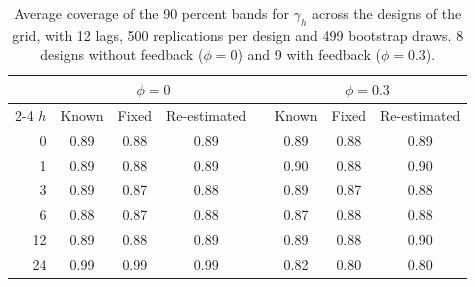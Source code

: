 \begin{table}[H]
\centering
\caption{Average coverage of the 90 percent bands for $\gamma_h$ across the designs of the grid, with 12 lags, 500 replications per design and 499 bootstrap draws. 8 designs without feedback ($\phi=0$) and 9 with feedback ($\phi=0.3$).\label{tab:mc-boot}}
\begin{tabular}{r ccc c ccc}
\toprule
 & \multicolumn{3}{c}{$\phi=0$} & & \multicolumn{3}{c}{$\phi=0.3$}\\
\cmidrule{2-4}\cmidrule{6-8}
$h$ & Known & Fixed & Re-estimated & & Known & Fixed & Re-estimated\\
\midrule
0 & 0.89 & 0.88 & 0.89 &  & 0.89 & 0.88 & 0.89\\
1 & 0.89 & 0.88 & 0.89 &  & 0.90 & 0.88 & 0.90\\
3 & 0.89 & 0.87 & 0.88 &  & 0.89 & 0.87 & 0.88\\
6 & 0.88 & 0.87 & 0.88 &  & 0.87 & 0.88 & 0.88\\
12 & 0.89 & 0.88 & 0.89 &  & 0.89 & 0.88 & 0.90\\
24 & 0.99 & 0.99 & 0.99 &  & 0.82 & 0.80 & 0.80\\
\bottomrule
\end{tabular}
\end{table}
